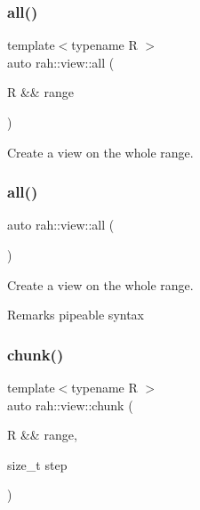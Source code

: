 \subsubsection{\texorpdfstring{all()}{all()}\hspace{0.1cm}{\footnotesize\ttfamily [1/2]}}
{\footnotesize\ttfamily template$<$typename R $>$ \\
auto rah\+::view\+::all (\begin{DoxyParamCaption}\item[{R \&\&}]{range }\end{DoxyParamCaption})}



Create a view on the whole range. 

\mbox{\label{namespacerah_1_1view_aeed660f7f6a4e0fbefffa4e42de7642a}} 
\subsubsection{\texorpdfstring{all()}{all()}\hspace{0.1cm}{\footnotesize\ttfamily [2/2]}}
{\footnotesize\ttfamily auto rah\+::view\+::all (\begin{DoxyParamCaption}{ }\end{DoxyParamCaption})}



Create a view on the whole range. 

\begin{DoxyRemark}{Remarks}
pipeable syntax 
\end{DoxyRemark}
\mbox{\label{namespacerah_1_1view_aa4ea72dd93cb1d17db2f4755bdee0cef}} 
\subsubsection{\texorpdfstring{chunk()}{chunk()}\hspace{0.1cm}{\footnotesize\ttfamily [1/2]}}
{\footnotesize\ttfamily template$<$typename R $>$ \\
auto rah\+::view\+::chunk (\begin{DoxyParamCaption}\item[{R \&\&}]{range,  }\item[{size\+\_\+t}]{step }\end{DoxyParamCaption})}



